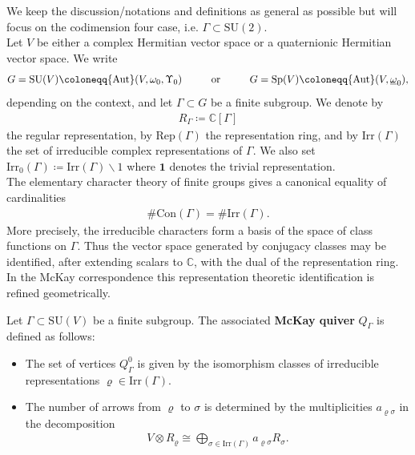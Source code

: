 \documentclass[psamsfonts]{amsart}
\theoremstyle{plain}
\theoremstyle{definition}{
\newtheorem{defi}{Definition}[section]
\newtheorem{ass}{Assumption}
\newtheorem*{nota}{Notation}}
\theoremstyle{remark}{
\newtheorem{rem}{Remark}
\newtheorem{ex}{Example}}
\theoremstyle{plain}{
\newtheorem{thm}{Theorem}[section]
\newtheorem{lem}{Lemma}[section]
\newtheorem{cor}{Corollary}[section]
\newtheorem{prop}{Proposition}[section]
\newtheorem{con}{Conjecture}[section]}
\newcommand{\m}[1]{{\mathrm{#1}}}
\newcommand{\oder}[1]{\hspace{#1}\text{or}\hspace{#1}}
\begin{document}
We keep the discussion/notations and definitions as general as possible but will focus on the codimension four case, i.e. $\Gamma\subset \m{SU}(2)$.\\


Let $V$ be either a complex Hermitian vector space or a quaternionic Hermitian vector space. We write
\begin{align*}
G=\m{SU}(V)\coloneqq \m{Aut}(V,\omega_0,\Upsilon_0)
\oder{1.0cm}
G=\m{Sp}(V)\coloneqq \m{Aut}(V,\underline{\omega}_0),
\end{align*}
depending on the context, and let $\Gamma\subset G$ be a finite subgroup. We denote by
\begin{align*}
    R_\Gamma\coloneqq \mathbb{C}[\Gamma]
\end{align*}
the regular representation, by $\m{Rep}(\Gamma)$ the representation ring, and by $\m{Irr}(\Gamma)$ the set of irreducible complex representations of $\Gamma$. We also set $\m{Irr}_0(\Gamma)\coloneqq\m{Irr}(\Gamma)\backslash 1$
where $\mathbf{1}$ denotes the trivial representation.\\

The elementary character theory of finite groups gives a canonical equality of cardinalities
\begin{align*}
\#\m{Con}(\Gamma)=\#\m{Irr}(\Gamma).
\end{align*}
More precisely, the irreducible characters form a basis of the space of class functions on $\Gamma$. Thus the vector space generated by conjugacy classes may be identified, after extending scalars to $\mathbb{C}$, with the dual of the representation ring. In the McKay correspondence this representation theoretic identification is refined geometrically.

\begin{defi}
Let $ \Gamma \subset \m{SU}(V) $ be a finite subgroup. The associated \textbf{McKay quiver} $ Q_\Gamma $ is defined as follows:
\begin{itemize}
    \item The set of vertices $ Q_\Gamma^0 $ is given by the isomorphism classes of irreducible representations $ \varrho \in \mathrm{Irr}(\Gamma) $.
    \item The number of arrows from $ \varrho $ to $ \sigma $ is determined by the multiplicities $ a_{\varrho\sigma} $ in the decomposition
    \begin{align*}
        V \otimes R_\varrho \cong \bigoplus_{\sigma \in \m{Irr}(\Gamma)} a_{\varrho\sigma} R_\sigma.
    \end{align*}
\end{itemize}
\end{defi}
\end{document}

